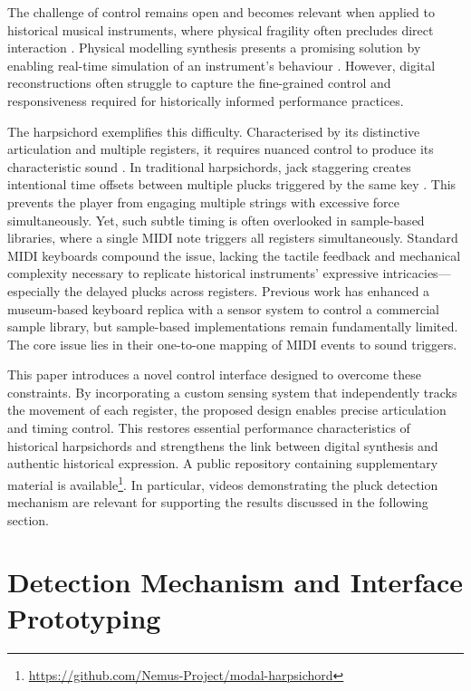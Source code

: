The challenge of control remains open and becomes relevant when applied to historical musical instruments, where physical fragility often precludes direct interaction \cite{mcalpine_sampling_2014,baldwin_tromba_2016,nemus_description_2023}. Physical modelling synthesis presents a promising solution by enabling real-time simulation of an instrument’s behaviour \cite{smith_physical_2010, bilbao_numerical_2009}. However, digital reconstructions often struggle to capture the fine-grained control and responsiveness required for historically informed performance practices.

The harpsichord exemplifies this difficulty. Characterised by its distinctive articulation and multiple registers, it requires nuanced control to produce its characteristic sound \cite{kottick_acoustics_1991}. In traditional harpsichords, jack staggering creates intentional time offsets between multiple plucks triggered by the same key \cite{veroli_optimising_2012}. This prevents the player from engaging multiple strings with excessive force simultaneously. Yet, such subtle timing is often overlooked in sample-based libraries, where a single MIDI note triggers all registers simultaneously. Standard MIDI keyboards compound the issue, lacking the tactile feedback and mechanical complexity necessary to replicate historical instruments’ expressive intricacies—especially the delayed plucks across registers. Previous work has enhanced a museum-based keyboard replica with a sensor system \cite{hamilton_augmentation_2025} to control a commercial sample library, but sample-based implementations remain fundamentally limited. The core issue lies in their one-to-one mapping of MIDI events to sound triggers.

This paper introduces a novel control interface designed to overcome these constraints. By incorporating a custom sensing system that independently tracks the movement of each register, the proposed design enables precise articulation and timing control. This restores essential performance characteristics of historical harpsichords and strengthens the link between digital synthesis and authentic historical expression. 
A public repository containing supplementary material is available\footnote{\href{https://github.com/Nemus-Project/modal-harpsichord}{https://github.com/Nemus-Project/modal-harpsichord}}. In particular, videos demonstrating the pluck detection mechanism are relevant for supporting the results discussed in the following section. 

\section{Detection Mechanism and Interface Prototyping}

